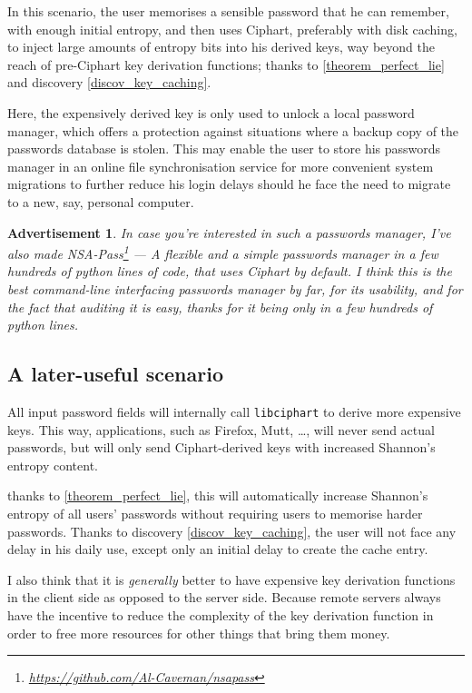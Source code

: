 \documentclass[twocolumn]{article}
\newtheorem{advertisement}{Advertisement}[section]
\begin{document}
In this scenario, the user memorises a sensible password that he can
remember, with enough initial entropy, and then uses Ciphart,
preferably with disk caching, to inject large amounts of entropy bits into
his derived keys, way beyond the reach of pre-Ciphart key derivation
functions; thanks to \cref{theorem_perfect_lie} and discovery
\ref{discov_key_caching}.

Here, the expensively derived key is only used to unlock a local password
manager, which offers a protection against situations where a backup copy
of the passwords database is stolen.  This may enable the user to store his
passwords manager in an online file synchronisation service for more
convenient system migrations to further reduce his login delays should he
face the need to migrate to a new, say, personal computer.

\begin{advertisement}
    In case you're interested in such a passwords manager, I've also made
    NSA-Pass\footnote{\url{https://github.com/Al-Caveman/nsapass}}
    --- A flexible and a simple passwords manager in a few hundreds of
    python lines of code, that uses Ciphart by default.  I think
    this is the best command-line interfacing passwords manager by far, for
    its usability, and for the fact that auditing it is easy, thanks for it
    being only in a few hundreds of python lines.
\end{advertisement}

\subsection{A later-useful scenario}
All input password fields will internally call \texttt{libciphart} to
derive more expensive keys.  This way, applications, such as
Firefox, Mutt, \ldots, will never send actual passwords, but
will only send Ciphart-derived keys with increased Shannon's entropy
content.

thanks to \cref{theorem_perfect_lie}, this will automatically
increase Shannon's entropy of all users' passwords without requiring users
to memorise harder passwords.  Thanks to discovery
\ref{discov_key_caching}, the user will not face any delay in his daily
use, except only an initial delay to create the cache entry.

I also think that it is \emph{generally} better to have expensive key
derivation functions in the client side as opposed to the server side.
Because remote servers always have the incentive to reduce the complexity
of the key derivation function in order to free more resources for other
things that bring them money.
\end{document}
